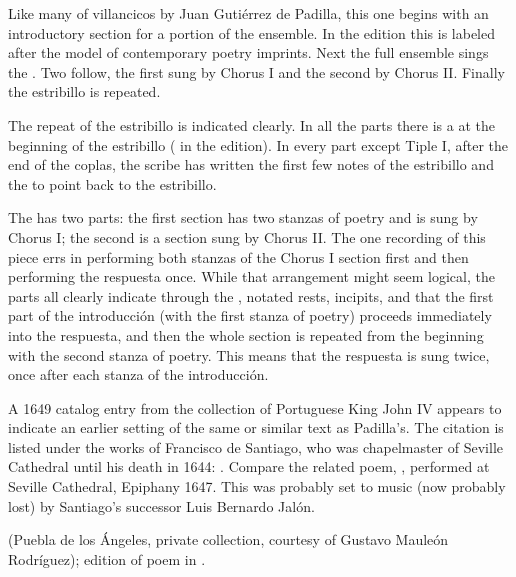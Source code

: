 
Like many of villancicos by Juan Gutiérrez de Padilla, this one begins with an
introductory section for a portion of the ensemble.
In the edition this is labeled  after the model of 
contemporary poetry imprints.
Next the full ensemble sings the .
Two  follow, the first sung by Chorus I and the second by 
Chorus II. 
Finally the estribillo is repeated.

The repeat of the estribillo is indicated clearly.
In all the parts there is a  at the beginning of the 
estribillo ( in the edition).
In every part except Tiple I, after the end of the coplas, the scribe has 
written the first few notes of the estribillo and the  to point 
back to the estribillo.

The  has two parts: the first section has two stanzas of 
poetry and is sung by Chorus I; the second is a  
section sung by Chorus II.
The one recording of this piece errs in performing both stanzas of the Chorus I 
section first and then performing the respuesta once.
While that arrangement might seem logical, the parts all clearly indicate 
through the , notated rests, incipits, and 
 that the first part of the introducción (with the first stanza 
of poetry) proceeds immediately into the respuesta, and then the whole section 
is repeated from the beginning with the second stanza of poetry.
This means that the respuesta is sung twice, once after each stanza of the 
introducción.


A 1649 catalog entry from the collection of Portuguese King John IV appears to 
indicate an earlier setting of the same or similar text as Padilla's.
The citation is listed under the works of Francisco de Santiago, who was 
chapelmaster of Seville Cathedral until his death in 1644: .%
  \Autocite[caixão 26, no.~674]{JohnIV:Catalog}
Compare the related poem, , performed at 
Seville Cathedral, Epiphany 1647.
This was probably set to music (now probably lost) by Santiago's successor Luis
Bernardo Jalón.%
\begin{Footnote}
     (Puebla de los Ángeles, private 
    collection, courtesy of Gustavo Mauleón Rodríguez); 
    edition of poem in \autocite[209]{Cashner:PhD}.
\end{Footnote}

\criticalnotesheader


